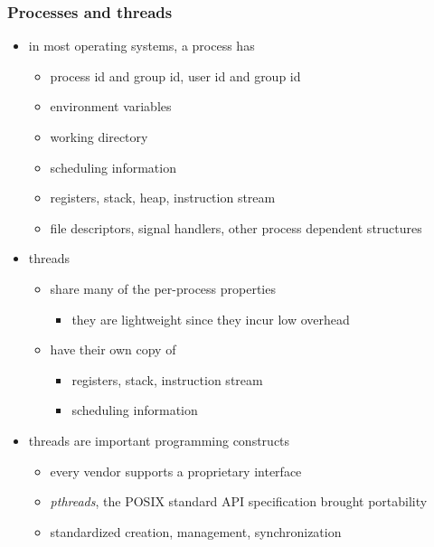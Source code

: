 \begin{frame}[fragile]
%
  \frametitle{Processes and threads}
%
  \begin{itemize}
%
  \item in most operating systems, a process has
    \begin{itemize}
    \item process id and group id, user id and group id
    \item environment variables
    \item working directory
    \item scheduling information
    \item registers, stack, heap, instruction stream
    \item file descriptors, signal handlers, other process dependent structures
    \end{itemize}
%
  \item threads 
    \begin{itemize}
      \item share many of the per-process properties
        \begin{itemize}
        \item they are lightweight since they incur low overhead
        \end{itemize}
      \item have their own copy of
        \begin{itemize}
        \item registers, stack, instruction stream
        \item scheduling information
        \end{itemize}
    \end{itemize}
%
  \item threads are important programming constructs
    \begin{itemize}
    \item every vendor supports a proprietary interface
    \item {\em pthreads}, the POSIX standard API specification brought portability
    \item standardized creation, management, synchronization
    \end{itemize}
%
  \end{itemize}
%
\end{frame}


